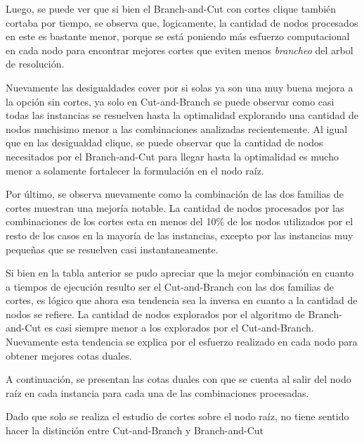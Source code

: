 Luego, se puede ver que si bien el Branch-and-Cut con cortes clique tambi\'en cortaba por tiempo, se observa que, logicamente, la cantidad de nodos procesados en este es bastante menor, porque se est\'a poniendo m\'as esfuerzo computacional en cada nodo para encontrar mejores cortes que eviten menos \emph{brancheo} del arbol de resoluci\'on.



Nuevamente las desigualdades cover por si solas ya son una muy buena mejora a la opci\'on sin cortes, ya solo en Cut-and-Branch se puede observar como casi todas las instancias se resuelven hasta la optimalidad explorando una cantidad de nodos muchisimo menor a las combinaciones analizadas recientemente. Al igual que en las desigualdad clique, se puede observar que la cantidad de nodos necesitados por el Branch-and-Cut para llegar hasta la optimalidad es mucho menor a solamente fortalecer la formulaci\'on en el nodo ra\'iz.


Por \'ultimo, se observa nuevamente como la combinaci\'on de las dos familias de cortes muestran una mejor\'ia notable. La cantidad de nodos procesados por las combinaciones de los cortes esta en menos del 10\% de los nodos utilizados por el resto de los casos en la mayor\'ia de las instancias, excepto por las instancias muy peque\~nas que se resuelven casi instantaneamente.

Si bien en la tabla anterior se pudo apreciar que la mejor combinaci\'on en cuanto a tiempos de ejecuci\'on resulto ser el Cut-and-Branch con las dos familias de cortes, es l\'ogico que ahora esa tendencia sea la inversa en cuanto a la cantidad de nodos se refiere. La cantidad de nodos explorados por el algoritmo de Branch-and-Cut es casi siempre menor a los explorados por el Cut-and-Branch. Nuevamente esta tendencia se explica por el esfuerzo realizado en cada nodo para obtener mejores cotas duales.

\newpage

A continuaci\'on, se presentan las cotas duales con que se cuenta al salir del nodo ra\'iz en cada instancia para cada una de las combinaciones procesadas.

Dado que solo se realiza el estudio de cortes sobre el nodo ra\'iz, no tiene sentido hacer la distinci\'on entre Cut-and-Branch y Branch-and-Cut



